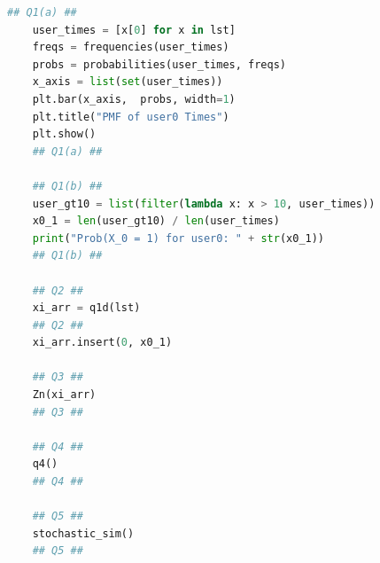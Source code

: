 \documentclass[a4paper,11pt]{article}
\theoremstyle{mytheor}
\begin{document}
\begin{lstlisting}[language=Python]
    ## Q1(a) ##
    user_times = [x[0] for x in lst]
    freqs = frequencies(user_times)
    probs = probabilities(user_times, freqs)
    x_axis = list(set(user_times))
    plt.bar(x_axis,  probs, width=1)
    plt.title("PMF of user0 Times")
    plt.show()
    ## Q1(a) ##

    ## Q1(b) ##
    user_gt10 = list(filter(lambda x: x > 10, user_times))
    x0_1 = len(user_gt10) / len(user_times)
    print("Prob(X_0 = 1) for user0: " + str(x0_1))
    ## Q1(b) ##

    ## Q2 ##
    xi_arr = q1d(lst)
    ## Q2 ##
    xi_arr.insert(0, x0_1)

    ## Q3 ##
    Zn(xi_arr)
    ## Q3 ##

    ## Q4 ##
    q4()
    ## Q4 ##

    ## Q5 ##
    stochastic_sim()
    ## Q5 ##
\end{lstlisting}
\end{document}
